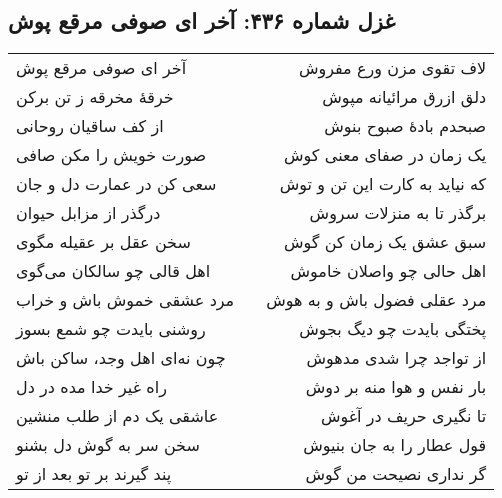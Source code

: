 \begin{center}
\section*{غزل شماره ۴۳۶: آخر ای صوفی مرقع پوش}
\label{sec:436}
\begin{longtable}{l p{0.5cm} r}
آخر ای صوفی مرقع پوش
&&
لاف تقوی مزن ورع مفروش
\\
خرقهٔ مخرقه ز تن برکن
&&
دلق ازرق مرائیانه مپوش
\\
از کف ساقیان روحانی
&&
صبحدم بادهٔ صبوح بنوش
\\
صورت خویش را مکن صافی
&&
یک زمان در صفای معنی کوش
\\
سعی کن در عمارت دل و جان
&&
که نیاید به کارت این تن و توش
\\
درگذر از مزابل حیوان
&&
برگذر تا به منزلات سروش
\\
سخن عقل بر عقیله مگوی
&&
سبق عشق یک زمان کن گوش
\\
اهل قالی چو سالکان می‌گوی
&&
اهل حالی چو واصلان خاموش
\\
مرد عشقی خموش باش و خراب
&&
مرد عقلی فضول باش و به هوش
\\
روشنی بایدت چو شمع بسوز
&&
پختگی بایدت چو دیگ بجوش
\\
چون نه‌ای اهل وجد، ساکن باش
&&
از تواجد چرا شدی مدهوش
\\
راه غیر خدا مده در دل
&&
بار نفس و هوا منه بر دوش
\\
عاشقی یک دم از طلب منشین
&&
تا نگیری حریف در آغوش
\\
سخن سر به گوش دل بشنو
&&
قول عطار را به جان بنیوش
\\
پند گیرند بر تو بعد از تو
&&
گر نداری نصیحت من گوش
\\
\end{longtable}
\end{center}
